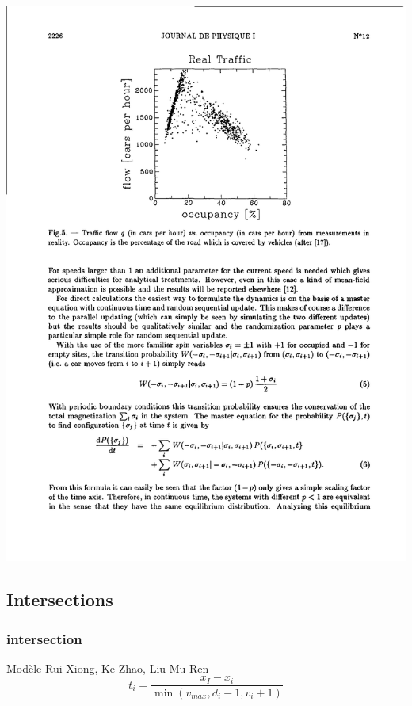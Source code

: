 \documentclass[slidetop,11pt]{beamer}
\begin{document}
\begin{frame}
\includegraphics[scale = 0.7]{./images/dfondcompre}
\end{frame}

\subsection{Intersections}
\begin{frame}
	\frametitle{intersection}
	Modèle Rui-Xiong, Ke-Zhao, Liu Mu-Ren
		\begin{equation}
			t_i = \frac{x_I - x_i}{\min(v_{max},d_i-1,v_i+1)}
		\end{equation}
\end{frame}
\end{document}
